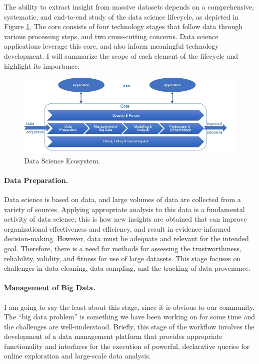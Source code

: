 \documentclass[11pt]{article}
\begin{document}
 The ability to extract insight from massive datasets depends on a comprehensive, systematic, and end-to-end study of the data science lifecycle, as depicted in Figure \ref{fig:lifecycle}. The core consists of four technology stages that follow data through various processing steps, and two cross-cutting concerns. Data science applications leverage this core, and also inform meaningful technology development. I will summarize the scope of each element of the lifecycle and highlight its importance.

\begin{figure}[h]
	\centering
	\includegraphics[scale=0.5]{letters/Figures/Lifecycle}
	\caption{Data Science Ecosystem.}
	\label{fig:lifecycle}
\end{figure}

\paragraph{Data Preparation.} Data science is based on data, and large volumes of data are collected from a variety of sources. Applying appropriate analysis to this data is a fundamental activity of data science; this is how new insights are obtained that can improve organizational effectiveness and efficiency, and result in evidence-informed decision-making. However, data must be adequate and relevant for the intended goal. Therefore, there is a need for methods for assessing the trustworthiness, reliability, validity, and fitness for use of large datasets. This stage focuses on challenges in data cleaning, data sampling, and the tracking of data provenance.

\paragraph{Management of Big Data.} I am going to say the least about this stage, since it is obvious to our community. The ``big data problem'' is something we have been working on for some time and the challenges are well-understood. Briefly, this stage of the workflow involves the development of a data management platform that provides appropriate functionality and interfaces for the execution of powerful, declarative queries for online exploration and large-scale data analysis.
\end{document}

